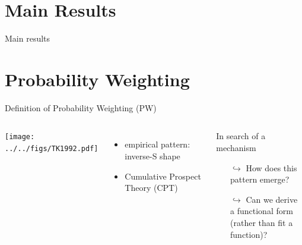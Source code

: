 \section{Main Results}

\begin{frame}{Main results}
\begin{center}
\end{center}

\label{MainResults}
\end{frame}

\section{Probability Weighting}

\begin{frame}{Definition of Probability Weighting (PW)}

\begin{columns}%
{\centering	\texttt{[image: ../../figs/TK1992.pdf]} }
\parencite[p. 310, Fig. 1,relabelled axes]{TverskyKahneman1992}

\begin{itemize}
  \item empirical pattern: inverse-S shape
  \item Cumulative Prospect Theory (CPT) \nocite{}
\end{itemize}
\vspace{1em}
\bi
	\item	{}
\ei
\vspace{1em}
\begin{block}{In search of a mechanism}
	\begin{itemize}
	  \item[$\hookrightarrow$] How does this pattern emerge?
  	\item[$\hookrightarrow$] Can we derive a functional form\\ 
	(rather than fit a function)?
	\end{itemize}
\end{block}

\end{columns}
\end{frame}


